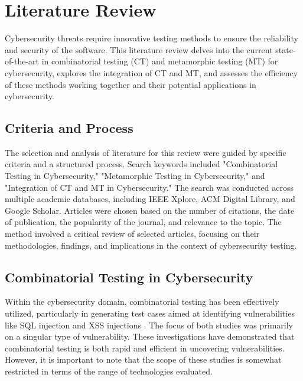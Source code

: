 \chapter{Literature Review}
\label{chap:lr}


Cybersecurity threats require innovative testing methods to ensure the reliability and security of the software. This literature review delves into the current state-of-the-art in combinatorial testing (CT) and metamorphic testing (MT) for cybersecurity, explores the integration of CT and MT, and assesses the efficiency of these methods working together and their potential applications in cybersecurity.

\section{Criteria and Process}

The selection and analysis of literature for this review were guided by specific criteria and a structured process. Search keywords included "Combinatorial Testing in Cybersecurity," "Metamorphic Testing in Cybersecurity," and "Integration of CT and MT in Cybersecurity." The search was conducted across multiple academic databases, including IEEE Xplore, ACM Digital Library, and Google Scholar. Articles were chosen based on the number of citations, the date of publication, the popularity of the journal, and relevance to the topic. The method involved a critical review of selected articles, focusing on their methodologies, findings, and implications in the context of cybersecurity testing.


\section{Combinatorial Testing in Cybersecurity}

Within the cybersecurity domain, combinatorial testing has been effectively utilized, particularly in generating test cases aimed at identifying vulnerabilities like SQL injection \cite{Simos2019SQL} and XSS injections \cite{Garn2014XSS}. The focus of both studies was primarily on a singular type of vulnerability. These investigations have demonstrated that combinatorial testing is both rapid and efficient in uncovering vulnerabilities. However, it is important to note that the scope of these studies is somewhat restricted in terms of the range of technologies evaluated.

